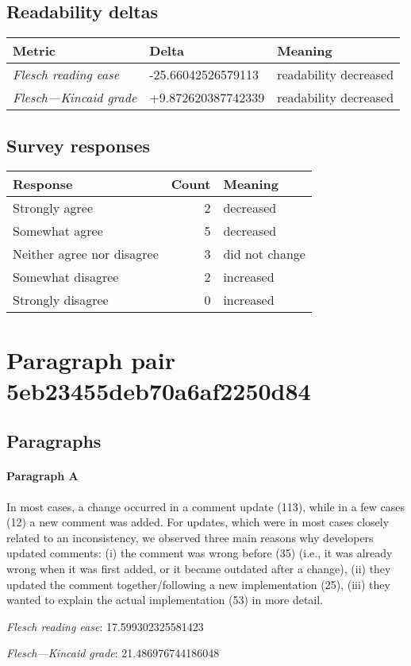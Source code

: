 \subsection{Readability deltas}

\begin{tabular}{lll}
\toprule
               \textbf{Metric} &      \textbf{Delta} &       \textbf{Meaning} \\
\midrule
    \emph{Flesch reading ease} &  -25.66042526579113 &  readability decreased \\
 \emph{Flesch---Kincaid grade} &  +9.872620387742339 &  readability decreased \\
\bottomrule
\end{tabular}

\subsection{Survey responses}
\begin{tabular}{lrl}
\toprule
          \textbf{Response} &  \textbf{Count} & \textbf{Meaning} \\
\midrule
             Strongly agree &               2 &        decreased \\
             Somewhat agree &               5 &        decreased \\
 Neither agree nor disagree &               3 &   did not change \\
          Somewhat disagree &               2 &        increased \\
          Strongly disagree &               0 &        increased \\
\bottomrule
\end{tabular}

\section{Paragraph pair 5eb23455deb70a6af2250d84}
\subsection{Paragraphs}
\paragraph{Paragraph A}
In most cases, a change occurred in a comment update (113), while in a few cases (12) a new comment was added. For updates, which were in most cases closely related to an inconsistency, we observed three main reasons why developers updated comments: (i) the comment was wrong before (35) (i.e., it was already wrong when it was first added, or it became outdated after a change), (ii) they updated the comment together/following a new implementation (25), (iii) they wanted to explain the actual implementation (53) in more detail.\par\medskip\emph{Flesch reading ease}: 17.599302325581423\par\emph{Flesch---Kincaid grade}: 21.486976744186048

